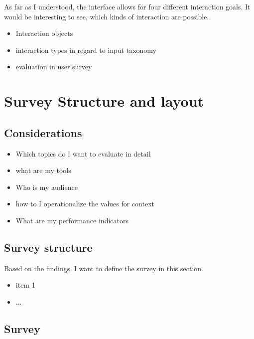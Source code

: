 \documentclass[titlepage, a4paper, 11pt]{scrartcl}
\begin{document}
{            As far as I understood, the interface allows for four different interaction goals. It would be interesting to see, which kinds of interaction are possible.                

            \begin{itemize}
                \item Interaction objects
                \item interaction types in regard to input taxonomy
                \item evaluation in user survey
            \end{itemize}
        
    \section{Survey Structure and layout}

        \subsection{Considerations}

            \begin{itemize}
                \item Which topics do I want to evaluate in detail
                \item what are my tools
                \item Who is my audience
                \item how to I operationalize the values for context
                \item What are my performance indicators
            \end{itemize}

        \subsection{Survey structure}\label{survey:structure}
		
            Based on the findings, I want to define the survey in this section.

            \begin{itemize}
                \item item 1
                \item ...
            \end{itemize}

        \subsection{Survey}

}
\end{document}
